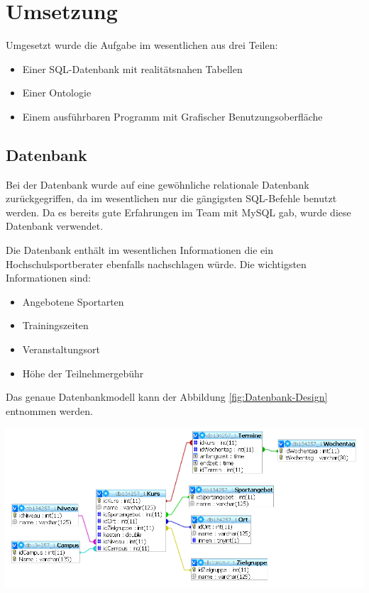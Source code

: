 \chapter{Umsetzung}

Umgesetzt wurde die Aufgabe im wesentlichen aus drei Teilen: 
\begin{itemize}
	\item Einer SQL-Datenbank mit realit\"atsnahen Tabellen 
	\item Einer Ontologie 
	\item Einem ausf\"uhrbaren Programm mit Grafischer Benutzungsoberfl\"ache

\end{itemize}

\section{Datenbank}

Bei der Datenbank wurde auf eine gew\"ohnliche relationale Datenbank zur\"uckgegriffen, da im wesentlichen nur die g\"angigsten SQL-Befehle benutzt werden. Da es bereits gute Erfahrungen im Team mit MySQL gab, wurde diese Datenbank verwendet. 

Die Datenbank enth\"alt im wesentlichen Informationen die ein Hochschulsportberater ebenfalls nachschlagen w\"urde. Die wichtigsten Informationen sind:
\begin{itemize}
\item Angebotene Sportarten
\item Trainingszeiten
\item Veranstaltungsort
\item H\"ohe der Teilnehmergeb\"uhr
\end{itemize} 
Das genaue Datenbankmodell kann der Abbildung \ref{fig:Datenbank-Design} entnommen werden.

\begin{capfigure}
	\includegraphics[width=\textwidth]{images/db_design}
\end{capfigure}

